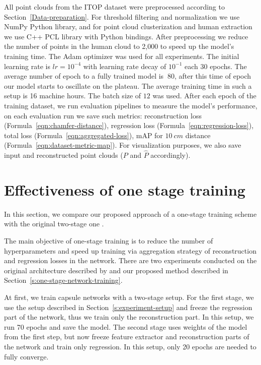 All point clouds from the ITOP dataset were preprocessed according to Section~\ref{Data-preparation}. For threshold filtering and normalization we use NumPy Python library, and for point cloud clusterization and human extraction we use C++ PCL \parencite{noauthor_strawlabpython-pcl_2021} library with Python bindings. After preprocessing we reduce the number of points in the human cloud to 2,000 to speed up the model's training time. The Adam optimizer \parencite{kingma_adam_2017} was used for all experiments. The initial learning rate is $lr = 10^{-4}$ with learning rate decay of $10^{-1}$ each $30$ epochs. The average number of epoch to a fully trained model is $~80$, after this time of epoch our model starts to oscillate on the plateau. The average training time in such a setup is 16 machine hours. The batch size of $12$ was used. After each epoch of the training dataset, we run evaluation pipelines to measure the model's performance, on each evaluation run we save such metrics: reconstruction loss (Formula~\ref{eqn:chamfer-distance}), regression loss (Formula~\ref{eqn:regression-loss}), total loss (Formula~\ref{eqn:aggregated-loss}), mAP for $10\  cm$ distance (Formula~\ref{eqn:dataset-metric-map}). For visualization purposes, we also save input and reconstructed point clouds ($P$ and $\hat{P}$ accordingly).


\section{Effectiveness of one stage training}
\label{s:one-stage-training}
In this section, we compare our proposed approach of a one-stage training scheme with the original two-stage one \parencite{wu_3d_2020}.

The main objective of one-stage training is to reduce the number of hyperparameters and speed up training via aggregation strategy of reconstruction and regression losses in the network. There are two experiments conducted on the original architecture described by \cite{wu_3d_2020} and our proposed method described in Section~\ref{s:one-stage-network-training}.

At first, we train capsule networks with a two-stage setup. For the first stage, we use the setup described in Section~\ref{s:experiment-setup} and freeze the regression part of the network, thus we train only the reconstruction part. In this setup, we run 70 epochs and save the model. The second stage uses weights of the model from the first step, but now freeze feature extractor and reconstruction parts of the network and train only regression. In this setup, only 20 epochs are needed to fully converge.

